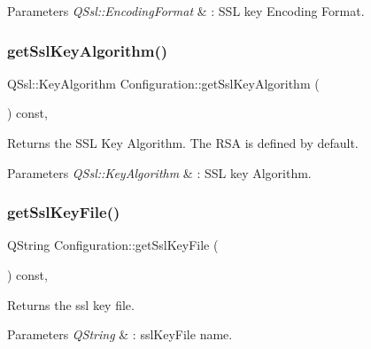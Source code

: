 \begin{DoxyParams}{Parameters}
{\em Q\+Ssl\+::\+Encoding\+Format} & \+: S\+SL key Encoding Format. \\
\hline
\end{DoxyParams}
\mbox{\label{class_configuration_a490e50bab0cdb1ccb531ee2472e97ca6}} 
\subsubsection{\texorpdfstring{get\+Ssl\+Key\+Algorithm()}{getSslKeyAlgorithm()}}
{\footnotesize\ttfamily Q\+Ssl\+::\+Key\+Algorithm Configuration\+::get\+Ssl\+Key\+Algorithm (\begin{DoxyParamCaption}{ }\end{DoxyParamCaption}) const\hspace{0.3cm}{\ttfamily [inline]}, {\ttfamily [noexcept]}}



Returns the S\+SL Key Algorithm. The R\+SA is defined by default. 


\begin{DoxyParams}{Parameters}
{\em Q\+Ssl\+::\+Key\+Algorithm} & \+: S\+SL key Algorithm. \\
\hline
\end{DoxyParams}
\mbox{\label{class_configuration_aff6b12e5b77552fb0feb9f9598335049}} 
\subsubsection{\texorpdfstring{get\+Ssl\+Key\+File()}{getSslKeyFile()}}
{\footnotesize\ttfamily Q\+String Configuration\+::get\+Ssl\+Key\+File (\begin{DoxyParamCaption}{ }\end{DoxyParamCaption}) const\hspace{0.3cm}{\ttfamily [inline]}, {\ttfamily [noexcept]}}



Returns the ssl key file. 


\begin{DoxyParams}{Parameters}
{\em Q\+String} & \+: ssl\+Key\+File name. \\
\hline
\end{DoxyParams}
\mbox{\label{class_configuration_abd78f9eb7315e0b0ed5c7d3088ce1795}} 
